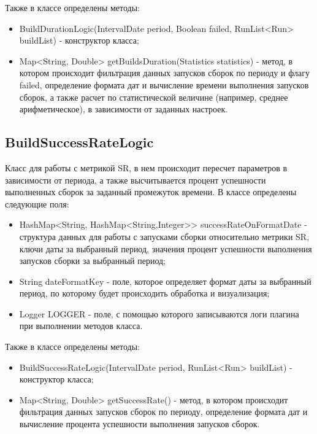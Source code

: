 Также в классе определены методы:

\begin{itemize}
	\item BuildDurationLogic(IntervalDate period, Boolean failed, RunList<Run> buildList) - конструктор класса;
	\item Map<String, Double> getBuildsDuration(Statistics statistics) - метод, в котором происходит фильтрация данных запусков сборок по периоду и флагу failed, определение формата дат и вычисление времени выполнения запусков сборок, а также расчет по статистической величине (например, среднее арифметическое), в зависимости от заданных настроек.
\end{itemize}

\subsection{BuildSuccessRateLogic}

Класс для работы с метрикой SR, в нем происходит пересчет параметров в зависимости от периода, а также высчитывается процент успешности выполненных сборок за заданный промежуток времени. В классе определены следующие поля:

\begin{itemize}
	\item HashMap<String, HashMap<String,Integer>> successRateOnFormatDate - структура данных для работы с запусками сборки относительно метрики SR, ключи даты за выбранный период, значения процент успешности выполнения запусков сборки за выбранный период;
	\item String dateFormatKey - поле, которое определяет формат даты за выбранный период, по которому будет происходить обработка и визуализация;
	\item Logger LOGGER - поле, с помощью которого записываются логи плагина при выполнении методов класса.
\end{itemize}

Также в классе определены методы:

\begin{itemize}
	\item BuildSuccessRateLogic(IntervalDate period, RunList<Run> buildList) - конструктор класса;
	\item Map<String, Double> getSuccessRate() - метод, в котором происходит фильтрация данных запусков сборок по периоду, определение формата дат и вычисление процента успешности выполнения запусков сборок.
\end{itemize}

